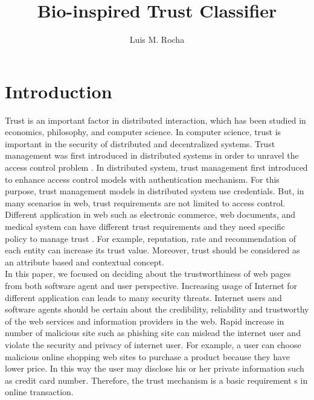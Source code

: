 \documentclass{llncs}
\begin{document}
\title{Bio-inspired Trust Classifier}
\author{Luis M. Rocha}

%
%
\maketitle

\section{Introduction}

Trust is an important factor in  distributed interaction, which has been studied in economics, philosophy, and computer science.  In computer science, trust is important in the security of distributed and decentralized systems.  Trust management was first introduced in distributed systems in order to unravel the access control problem \cite{blaze}. In distributed system, trust management first introduced to enhance access control models with authentication mechanism. For this purpose, trust management models in distributed system use credentials. But, in many scenarios in  web, trust requirements are not limited to access control. Different application in web such as electronic commerce, web documents, and medical system can have different trust requirements and they need specific policy to  manage trust \cite{surveyInternt}. For example, reputation, rate and recommendation of each entity can  increase its trust value. Moreover, trust should be considered as an attribute based and contextual concept.\\

In this paper, we focused on deciding about the trustworthiness of web pages from both software agent and user perspective. Increasing usage of Internet for different application can leads to many security threats. Internet users and software agents should be certain about the credibility, reliability and trustworthy of the web services and information providers in the web.  Rapid increase in number of malicious site such as phishing site can mislead the internet user and  violate the security and privacy of internet user.  For example, a user can choose malicious online shopping web sites to purchase a product because they have lower price. In this way the user may disclose his or her private information such as credit card number. Therefore, the trust  mechanism is a basic requirement s in online transaction. \\
\end{document}
